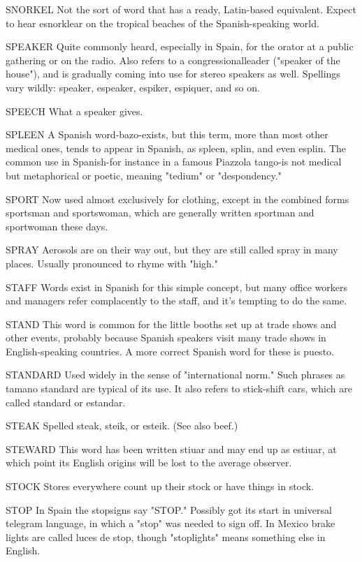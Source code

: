 SNORKEL Not the sort of word that has a ready, Latin-based
equivalent. Expect to hear esnorklear on the tropical beaches of the
Spanish-speaking world.

SPEAKER Quite commonly heard, especially in Spain, for
the orator at a public gathering or on the radio. Also refers to a congressionalleader ("speaker of the house"), and is gradually coming
into use for stereo speakers as well. Spellings vary wildly: speaker,
espeaker, espiker, espiquer, and so on.

SPEECH What a speaker gives.

SPLEEN A Spanish word-bazo-exists, but this term, more
than most other medical ones, tends to appear in Spanish, as spleen,
splin, and even esplin. The common use in Spanish-for instance in
a famous Piazzola tango-is not medical but metaphorical or poetic,
meaning "tedium" or "despondency."

SPORT Now used almost exclusively for clothing, except in
the combined forms sportsman and sportswoman, which are generally
written sportman and sportwoman these days.

SPRAY Aerosols are on their way out, but they are still called
spray in many places. Usually pronounced to rhyme with "high."

STAFF Words exist in Spanish for this simple concept, but
many office workers and managers refer complacently to the staff, and
it's tempting to do the same.

STAND This word is common for the little booths set up at
trade shows and other events, probably because Spanish speakers visit
many trade shows in English-speaking countries. A more correct Spanish word for these is puesto.

STANDARD Used widely in the sense of "international
norm." Such phrases as tamano standard are typical of its use. It
also refers to stick-shift cars, which are called standard or estandar.

STEAK Spelled steak, steik, or esteik. (See also beef.)

STEWARD This word has been written stiuar and may end up
as estiuar, at which point its English origins will be lost to the average
observer.

STOCK Stores everywhere count up their stock or have
things in stock.

STOP In Spain the stopsigns say "STOP." Possibly got its
start in universal telegram language, in which a "stop" was needed to
sign off. In Mexico brake lights are called luces de stop, though "stoplights" means something else in English.

